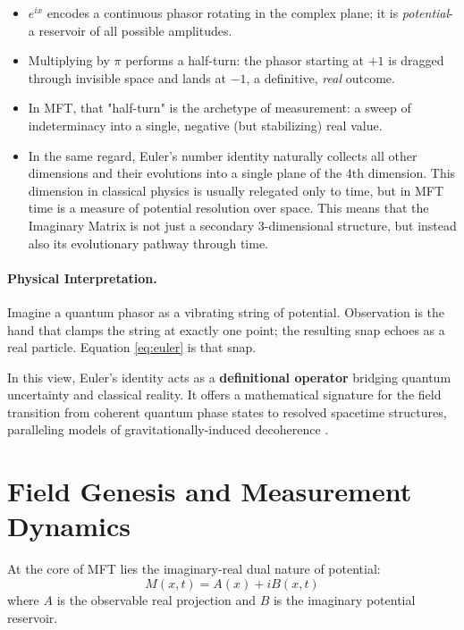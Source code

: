 \begin{itemize}
  \item $e^{ix}$ encodes a continuous phasor rotating in the complex plane; it is \emph{potential}-a reservoir of all possible amplitudes.
  \item Multiplying by $\pi$ performs a half-turn: the phasor starting at $+1$ is dragged through invisible space and lands at $-1$, a definitive, \emph{real} outcome.
  \item In MFT, that "half-turn" is the archetype of measurement: a sweep of indeterminacy into a single, negative (but stabilizing) real value.
  \item In the same regard, Euler's number identity naturally collects all other dimensions and their evolutions into a single plane of the 4th dimension. This dimension in classical physics is usually relegated only to time, but in MFT time is a measure of potential resolution over space. This means that the Imaginary Matrix is not just a secondary 3-dimensional structure, but instead also its evolutionary pathway through time.
\end{itemize}

\paragraph{Physical Interpretation.}
Imagine a quantum phasor as a vibrating string of potential. Observation is the hand that clamps the string at exactly one point; the resulting snap echoes as a real particle. Equation \eqref{eq:euler} is that snap.

In this view, Euler's identity acts as a \textbf{definitional operator} bridging quantum uncertainty and classical reality. It offers a mathematical signature for the field transition from coherent quantum phase states to resolved spacetime structures, paralleling models of gravitationally-induced decoherence \cite{penrose_gravitys_1996}.


\section{Field Genesis and Measurement Dynamics}

At the core of MFT lies the imaginary-real dual nature of potential:
\begin{equation}
M(x,t) = A(x) + i B(x,t)
\end{equation}
where $A$ is the observable real projection and $B$ is the imaginary potential reservoir.

